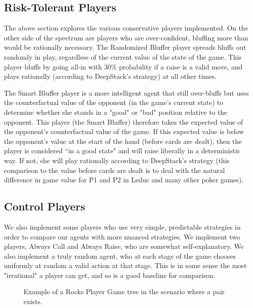 \documentclass{article}
\begin{document}
\subsection{Risk-Tolerant Players}
The above section explores the various conservative players implemented.  On the other side of the spectrum are players who are over-confident, bluffing more than would be rationally necessary. The Randomized Bluffer player spreads bluffs out randomly in play, regardless of the current value of the state of the game. This player bluffs by going all-in with 30\% probability if a raise is a valid move, and plays rationally (according to DeepStack's strategy) at all other times. 

\indent The Smart Bluffer player is a more intelligent agent that still over-bluffs but uses the counterfactual value of the opponent (in the game's current state) to determine whether she stands in a "good" or "bad" position relative to the opponent. This player (the Smart Bluffer) therefore takes the expected value of the opponent's counterfactual value of the game. If this expected value is below the opponent's value at the start of the hand (before cards are dealt), then the player is considered ``in a good state" and will raise liberally in a deterministic way. If not, she will play rationally according to DeepStack's strategy (this comparison to the value before cards are dealt is to deal with the natural difference in game value for P1 and P2 in Leduc and many other poker games).

\subsection{Control Players}
We also implement some players who use very simple, predictable strategies in order to compare our agents with more nuanced strategies. We implement two players, Always Call and Always Raise, who are somewhat self-explanatory. We also implement a truly random agent, who at each stage of the game chooses uniformly at random a valid action at that stage. This is in some sense the most "irrational" a player can get, and so is a good baseline for comparison.

\begin{figure}[!b]
\begin{center}
\end{center}
   \caption{Example of a Rocks Player Game tree in the scenario where a pair exists.}
\label{fig:short}
\end{figure}
\end{document}
